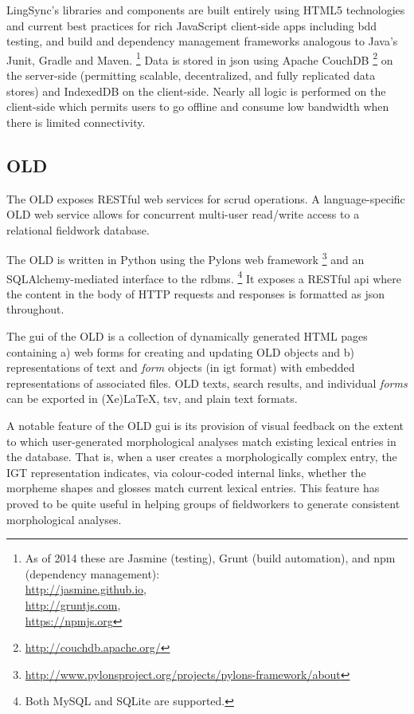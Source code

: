 \documentclass[11pt]{article}
\begin{document}
LingSync's libraries and components are built entirely using HTML5 technologies
and current best practices for rich JavaScript client-side apps including
\gls{bdd} testing, and build and dependency management frameworks analogous to
Java's Junit, Gradle and Maven.%
\footnote{As of 2014 these are Jasmine (testing), Grunt (build automation), and
    \gls{npm} (dependency management):\\
    \url{http://jasmine.github.io}, \\
    \url{http://gruntjs.com}, \\
\url{https://npmjs.org}}
Data is stored in \gls{json} using Apache CouchDB%
\footnote{\url{http://couchdb.apache.org/}} %
on the server-side (permitting scalable, decentralized, and fully replicated
data stores) and IndexedDB on the client-side. Nearly all logic is performed on
the client-side which permits users to go offline and consume low bandwidth
when there is limited connectivity.


\subsection{OLD}\label{sec:old}

The OLD  exposes RESTful web services for \gls{scrud} operations. A
language-specific OLD web service allows for concurrent multi-user read/write
access to a relational fieldwork database.

The OLD is written in Python using the Pylons web framework%
\footnote{\url{http://www.pylonsproject.org/projects/pylons-framework/about}} %
and an SQLAlchemy-mediated interface to the \gls{rdbms}.%
\footnote{Both MySQL and SQLite are supported.} %
It exposes a RESTful \gls{api} where the content in the body of HTTP requests
and responses is formatted as \gls{json} throughout.%

The \gls{gui} of the OLD is a collection of dynamically generated HTML pages
containing a) web forms for creating and updating OLD objects and b)
representations of text and \emph{form} objects (in \gls{igt} format) with
embedded representations of associated files. OLD texts, search results, and
individual \emph{forms} can be exported in (Xe)LaTeX, \gls{tsv}, and plain text
formats.

A notable feature of the OLD \gls{gui} is its provision of visual feedback on
the extent to which user-generated morphological analyses match existing
lexical entries in the database. That is, when a user creates a morphologically
complex entry, the IGT representation indicates, via colour-coded internal
links, whether the morpheme shapes and glosses match current lexical entries.
This feature has proved to be quite useful in helping groups of fieldworkers to
generate consistent morphological analyses.
\end{document}
